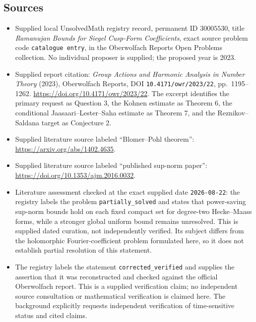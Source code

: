 \documentclass[11pt]{article}
\begin{document}
\subsection{Sources}
\begin{itemize}
\item Supplied local UnsolvedMath registry record, permanent ID \(30005530\), title \emph{Ramanujan Bounds for Siegel Cusp-Form Coefficients}, exact source problem code \texttt{catalogue entry}, in the Oberwolfach Reports Open Problems collection. No individual proposer is supplied; the proposed year is 2023.
\item Supplied report citation: \emph{Group Actions and Harmonic Analysis in Number Theory} (2023), Oberwolfach Reports, DOI \texttt{10.4171/owr/2023/22}, pp.\ 1195--1262. \url{https://doi.org/10.4171/owr/2023/22}. The excerpt identifies the primary request as Question 3, the Kohnen estimate as Theorem 6, the conditional Jaasaari--Lester--Saha estimate as Theorem 7, and the Reznikov--Saldana target as Conjecture 2.
\item Supplied literature source labeled ``Blomer--Pohl theorem'': \url{https://arxiv.org/abs/1402.4635}.
\item Supplied literature source labeled ``published sup-norm paper'': \url{https://doi.org/10.1353/ajm.2016.0032}.
\item Literature assessment checked at the exact supplied date \texttt{2026-08-22}: the registry labels the problem \texttt{partially\_solved} and states that power-saving sup-norm bounds hold on each fixed compact set for degree-two Hecke--Maass forms, while a stronger global uniform bound remains unresolved. This is supplied dated curation, not independently verified. Its subject differs from the holomorphic Fourier-coefficient problem formulated here, so it does not establish partial resolution of this statement.
\item The registry labels the statement \texttt{corrected\_verified} and supplies the assertion that it was reconstructed and checked against the official Oberwolfach report. This is a supplied verification claim; no independent source consultation or mathematical verification is claimed here. The background explicitly requests independent verification of time-sensitive status and cited claims.
\end{itemize}
\end{document}
